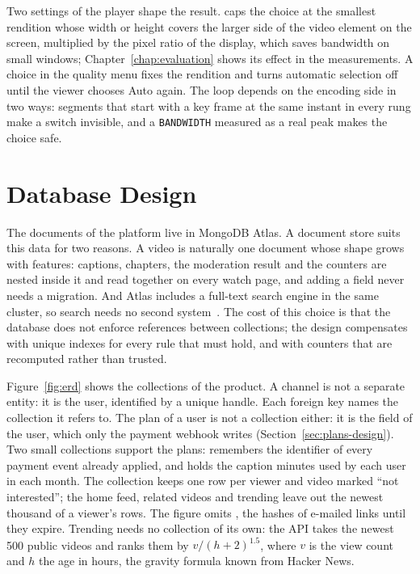 Two settings of the player shape the result.  caps the choice at the
smallest rendition whose width or height covers the larger side of the video element on the screen,
multiplied by the pixel ratio of the display, which saves bandwidth on small windows; Chapter~\ref{chap:evaluation} shows its effect in the measurements. A choice in the quality
menu fixes the rendition and turns automatic selection off until the viewer chooses Auto again. The
loop depends on the encoding side in two ways: segments that start with a key frame at the same
instant in every rung make a switch invisible, and a \texttt{BANDWIDTH} measured as a real peak makes
the choice safe.

\section{Database Design}
\label{sec:database-design}

The documents of the platform live in MongoDB Atlas. A document store suits this data for two
reasons. A video is naturally one document whose shape grows with features: captions, chapters, the
moderation result and the counters are nested inside it and read together on every watch page, and
adding a field never needs a migration. And Atlas includes a full-text search engine in the same
cluster, so search needs no second system~\cite{mongodbsearch}. The cost of this choice is that the
database does not enforce references between collections; the design compensates with unique indexes
for every rule that must hold, and with counters that are recomputed rather than trusted.

Figure~\ref{fig:erd} shows the collections of the product. A channel is not a separate entity:
it is the user, identified by a unique handle. Each foreign key names the collection it refers to.
The plan of a user is not a collection either: it is the  field of the user, which only
the payment webhook writes (Section~\ref{sec:plans-design}). Two small collections support the plans:
 remembers the identifier of every payment event already applied, and
 holds the caption minutes used by each user in each month. The collection
 keeps one row per viewer and video marked ``not interested''; the home feed,
related videos and trending leave out the newest thousand of a viewer's rows. The figure omits
, the hashes of e-mailed links until they expire. Trending needs no
collection of its own: the API takes the newest 500 public videos and ranks them by
$v / (h + 2)^{1.5}$, where $v$ is the view count and $h$ the age in hours, the gravity formula
known from Hacker News.


